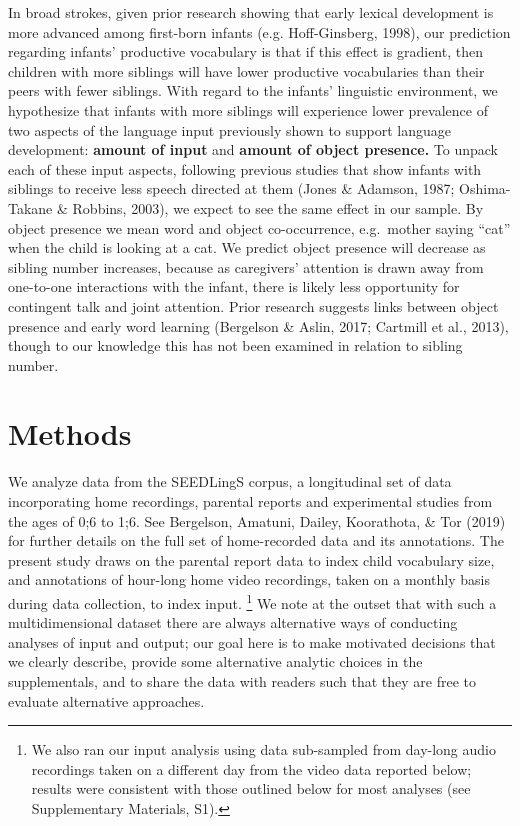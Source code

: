\documentclass[
  english,
  man,floatsintext]{apa6}
\begin{document}
In broad strokes, given prior research showing that early lexical development is more advanced among first-born infants (e.g. Hoff-Ginsberg, 1998), our prediction regarding infants' productive vocabulary is that if this effect is gradient, then children with more siblings will have lower productive vocabularies than their peers with fewer siblings. With regard to the infants' linguistic environment, we hypothesize that infants with more siblings will experience lower prevalence of two aspects of the language input previously shown to support language development: \textbf{amount of input} and \textbf{amount of object presence.} To unpack each of these input aspects, following previous studies that show infants with siblings to receive less speech directed at them (Jones \& Adamson, 1987; Oshima-Takane \& Robbins, 2003), we expect to see the same effect in our sample. By object presence we mean word and object co-occurrence, e.g.~mother saying ``cat'' when the child is looking at a cat. We predict object presence will decrease as sibling number increases, because as caregivers' attention is drawn away from one-to-one interactions with the infant, there is likely less opportunity for contingent talk and joint attention. Prior research suggests links between object presence and early word learning (Bergelson \& Aslin, 2017; Cartmill et al., 2013), though to our knowledge this has not been examined in relation to sibling number.

\hypertarget{methods}{%
\section{Methods}\label{methods}}

We analyze data from the SEEDLingS corpus, a longitudinal set of data incorporating home recordings, parental reports and experimental studies from the ages of 0;6 to 1;6. See Bergelson, Amatuni, Dailey, Koorathota, \& Tor (2019) for further details on the full set of home-recorded data and its annotations. The present study draws on the parental report data to index child vocabulary size, and annotations of hour-long home video recordings, taken on a monthly basis during data collection, to index input. \footnote{We also ran our input analysis using data sub-sampled from day-long audio recordings taken on a different day from the video data reported below; results were consistent with those outlined below for most analyses (see Supplementary Materials, S1).} We note at the outset that with such a multidimensional dataset there are always alternative ways of conducting analyses of input and output; our goal here is to make motivated decisions that we clearly describe, provide some alternative analytic choices in the supplementals, and to share the data with readers such that they are free to evaluate alternative approaches.
\end{document}
